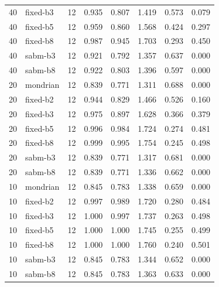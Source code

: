 \begin{tabular}{llrccccc}
40 & fixed-b3 & 12 & 0.935 & 0.807 & 1.419 & 0.573 & 0.079\\
40 & fixed-b5 & 12 & 0.959 & 0.860 & 1.568 & 0.424 & 0.297\\
40 & fixed-b8 & 12 & 0.987 & 0.945 & 1.703 & 0.293 & 0.450\\
40 & sabm-b3 & 12 & 0.921 & 0.792 & 1.357 & 0.637 & 0.000\\
40 & sabm-b8 & 12 & 0.922 & 0.803 & 1.396 & 0.597 & 0.000\\
\midrule
20 & mondrian & 12 & 0.839 & 0.771 & 1.311 & 0.688 & 0.000\\
20 & fixed-b2 & 12 & 0.944 & 0.829 & 1.466 & 0.526 & 0.160\\
20 & fixed-b3 & 12 & 0.975 & 0.897 & 1.628 & 0.366 & 0.379\\
20 & fixed-b5 & 12 & 0.996 & 0.984 & 1.724 & 0.274 & 0.481\\
20 & fixed-b8 & 12 & 0.999 & 0.995 & 1.754 & 0.245 & 0.498\\
20 & sabm-b3 & 12 & 0.839 & 0.771 & 1.317 & 0.681 & 0.000\\
20 & sabm-b8 & 12 & 0.839 & 0.771 & 1.336 & 0.662 & 0.000\\
\midrule
10 & mondrian & 12 & 0.845 & 0.783 & 1.338 & 0.659 & 0.000\\
10 & fixed-b2 & 12 & 0.997 & 0.989 & 1.720 & 0.280 & 0.484\\
10 & fixed-b3 & 12 & 1.000 & 0.997 & 1.737 & 0.263 & 0.498\\
10 & fixed-b5 & 12 & 1.000 & 1.000 & 1.745 & 0.255 & 0.499\\
10 & fixed-b8 & 12 & 1.000 & 1.000 & 1.760 & 0.240 & 0.501\\
10 & sabm-b3 & 12 & 0.845 & 0.783 & 1.344 & 0.652 & 0.000\\
10 & sabm-b8 & 12 & 0.845 & 0.783 & 1.363 & 0.633 & 0.000\\
\bottomrule
\end{tabular}
